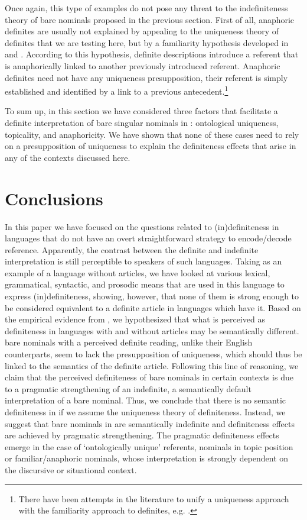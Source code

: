 \documentclass[output=paper,
colorlinks,
citecolor=brown,
newtxmath
]{langscibook}
\begin{document}
\noindent Once again, this type of examples do not pose any threat to the indefiniteness theory of bare nominals proposed in the previous section. First of all, anaphoric definites are usually not explained by appealing to the uniqueness theory of definites that we are testing here, but by a familiarity hypothesis developed in \citet{Kamp1981} and \citet{Heim1982}. According to this hypothesis, definite descriptions introduce a referent that is anaphorically linked to another previously introduced referent. Anaphoric definites need not have any uniqueness presupposition, their referent is simply established and identified by a link to a previous antecedent.\footnote{There have been attempts in the literature to unify a uniqueness approach with the familiarity approach to definites, e.g. \citet{farkas03}.}

To sum up, in this section we have considered three factors that facilitate a definite interpretation of bare singular nominals in : ontological uniqueness, topicality, and anaphoricity. We have shown that none of these cases need to rely on a presupposition of uniqueness to explain the definiteness effects that arise in any of the contexts discussed here.

\section{Conclusions}
In this paper we have focused on the questions related to (in)definiteness in languages that do not have an overt straightforward strategy to encode/decode reference. Apparently, the contrast between the definite and indefinite interpretation is still perceptible to speakers of such languages. Taking  as an example of a language without articles, we have looked at various lexical, grammatical, syntactic, and prosodic means that are used in this language to express (in)definiteness, showing, however, that none of them is strong enough to be considered equivalent to a definite article in languages which have it. Based on the empirical evidence from , we hypothesized that what is perceived as definiteness in languages with and without articles may be semantically different.  bare nominals with a perceived definite reading, unlike their English counterparts, seem to lack the presupposition of uniqueness, which should thus be linked to the semantics of
the definite article. Following this line of reasoning, we claim that the perceived definiteness of  bare nominals in certain contexts is due to a pragmatic strengthening of an indefinite, a semantically default interpretation of a bare nominal. Thus, we conclude that there is no semantic definiteness in  if we assume the uniqueness theory of definiteness. Instead, we suggest that bare nominals in  are semantically indefinite and definiteness effects are achieved by pragmatic strengthening. The pragmatic definiteness effects emerge in the case of `ontologically unique' referents, nominals in topic position or familiar/anaphoric nominals, whose interpretation is strongly dependent on the discursive or situational context.
\end{document}
